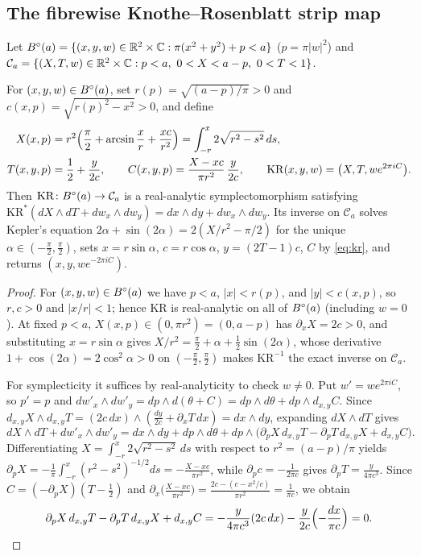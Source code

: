 \subsection{The fibrewise Knothe--Rosenblatt strip map}\label{sec:kr}

Let $B^{\circ}(a)=\{(x,y,w)\in\mathbb{R}^2\times\mathbb{C}:\pi(x^2+y^2)+p<a\}$ ($p=\pi|w|^2$) and
$\mathcal C_a=\{(X,T,w)\in\R^2\times\C:p<a,\ 0<X<a-p,\ 0<T<1\}$.

\begin{proposition}\label{prop:kr}
For $(x,y,w)\in B^{\circ}(a)$, set $r(p)=\sqrt{(a-p)/\pi}>0$ and $c(x,p)=\sqrt{r(p)^2-x^2}>0$, and define
\begin{equation}\label{eq:kr}
 \begin{aligned}
 X(x,p) &= r^2\Bigl(\frac\pi2+\arcsin\frac xr+\frac{xc}{r^2}\Bigr)=\int_{-r}^x 2\sqrt{r^2-s^2}\,ds,\\
 T(x,y,p) &= \frac12+\frac{y}{2c},\qquad
 C(x,y,p) = \frac{X-xc}{\pi r^2}\,\frac{y}{2c},\qquad
 \mathrm{KR}(x,y,w)=\bigl(X,T,w e^{2\pi iC}\bigr).
 \end{aligned}
\end{equation}
Then $\mathrm{KR}\colon B^{\circ}(a)\to\mathcal C_a$ is a real-analytic symplectomorphism satisfying
$\mathrm{KR}^*(dX\wedge dT+dw_x\wedge dw_y)=dx\wedge dy+dw_x\wedge dw_y$. Its inverse on $\mathcal C_a$ solves Kepler's
equation $2\alpha+\sin(2\alpha)=2(X/r^2-\pi/2)$ for the unique $\alpha\in(-\frac\pi2,\frac\pi2)$, sets $x=r\sin\alpha$,
$c=r\cos\alpha$, $y=(2T-1)c$, $C$ by \eqref{eq:kr}, and returns $(x,y,w e^{-2\pi iC})$.
\end{proposition}

\begin{proof}
For $(x,y,w)\in B^{\circ}(a)$ we have $p<a$, $|x|<r(p)$, and $|y|<c(x,p)$, so $r,c>0$ and $|x/r|<1$; hence $\mathrm{KR}$ is
real-analytic on all of $B^{\circ}(a)$ (including $w=0$). At fixed $p<a$, $X(x,p)\in(0,\pi r^2)=(0,a-p)$ has
$\partial_xX=2c>0$, and substituting $x=r\sin\alpha$ gives $X/r^2=\frac\pi2+\alpha+\frac12\sin(2\alpha)$, whose
derivative $1+\cos(2\alpha)=2\cos^2\alpha>0$ on $(-\frac\pi2,\frac\pi2)$ makes $\mathrm{KR}^{-1}$ the exact inverse on
$\mathcal C_a$.

For symplecticity it suffices by real-analyticity to check $w\ne0$. Put $w'=w e^{2\pi iC}$, so $p'=p$ and
$dw'_x\wedge dw'_y=dp\wedge d(\theta+C)=dp\wedge d\theta+dp\wedge d_{x,y}C$. Since
$d_{x,y}X\wedge d_{x,y}T=(2c\,dx)\wedge(\frac{dy}{2c}+\partial_xT\,dx)=dx\wedge dy$, expanding $dX\wedge dT$ gives
\[
 dX\wedge dT + dw'_x\wedge dw'_y
 = dx\wedge dy + dp\wedge d\theta + dp\wedge\bigl(\partial_pX\,d_{x,y}T - \partial_pT\,d_{x,y}X + d_{x,y}C\bigr).
\]
Differentiating $X=\int_{-r}^x2\sqrt{r^2-s^2}\,ds$ with respect to $r^2=(a-p)/\pi$ yields
$\partial_pX=-\frac{1}{\pi}\int_{-r}^x(r^2-s^2)^{-1/2}ds=-\frac{X-xc}{\pi r^2}$, while
$\partial_pc=-\frac{1}{2\pi c}$ gives $\partial_pT=\frac{y}{4\pi c^3}$. Since $C=(-\partial_pX)(T-\frac12)$ and
$\partial_x\bigl(\frac{X-xc}{\pi r^2}\bigr)=\frac{2c-(c-x^2/c)}{\pi r^2}=\frac{1}{\pi c}$, we obtain
\[
 \partial_pX\,d_{x,y}T - \partial_pT\,d_{x,y}X + d_{x,y}C
 = -\frac{y}{4\pi c^3}(2c\,dx) - \frac{y}{2c}\Bigl(-\frac{dx}{\pi c}\Bigr) = 0.\qedhere
\]
\end{proof}

